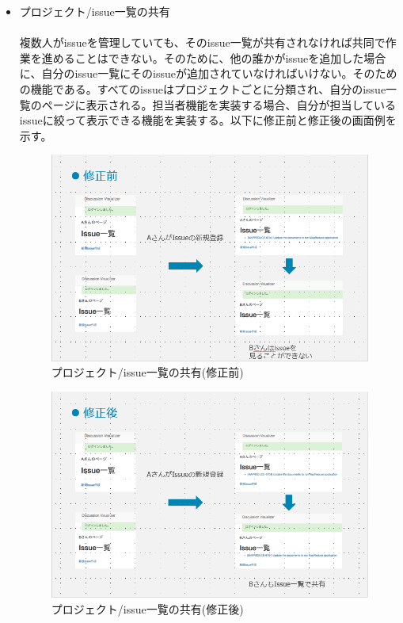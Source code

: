 \documentclass[12pt, oneside]{jreport}
\begin{document}
\begin{itemize}
			\item プロジェクト/issue一覧の共有
			\\ \\
			複数人がissueを管理していても、そのissue一覧が共有されなければ共同で作業を進めることはできない。そのために、他の誰かがissueを追加した場合に、自分のissue一覧にそのissueが追加されていなければいけない。そのための機能である。すべてのissueはプロジェクトごとに分類され、自分のissue一覧のページに表示される。担当者機能を実装する場合、自分が担当しているissueに絞って表示できる機能を実装する。以下に修正前と修正後の画面例を示す。
			\begin{figure}[H]
			\centering
			\includegraphics[width=17cm,bb=200 300 -200 27]{IssShare_before.PNG}
			\caption{プロジェクト/issue一覧の共有(修正前)}
			\end{figure}
			\begin{figure}[H]
			\centering
			\includegraphics[width=17cm,bb=200 300 -200 27]{IssShare_after.PNG}
			\caption{プロジェクト/issue一覧の共有(修正後)}
			\end{figure}


\end{itemize}
\end{document}
